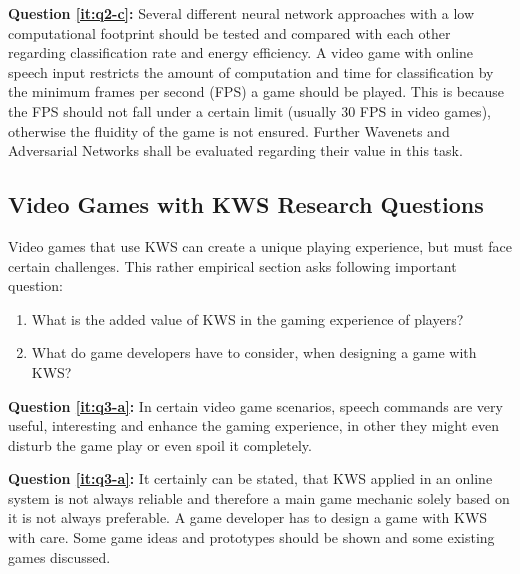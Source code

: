 \textbf{Question \ref{it:q2-c}:}
Several different neural network approaches with a low computational footprint should be tested and compared with each other regarding classification rate and energy efficiency. 
A video game with online speech input restricts the amount of computation and time for classification by the minimum frames per second (FPS) a game should be played.
This is because the FPS should not fall under a certain limit (usually 30 FPS in video games), otherwise the fluidity of the game is not ensured.
Further Wavenets and Adversarial Networks shall be evaluated regarding their value in this task.



\subsection{Video Games with KWS Research Questions}\label{sec:intro_rq_games}
Video games that use KWS can create a unique playing experience, but must face certain challenges.
This rather empirical section asks following important question:

\begin{enumerate}[label={Q.3.\alph*)}, leftmargin=1.75cm]
    \item What is the added value of KWS in the gaming experience of players?
    \label{it:q3-a}
    \item What do game developers have to consider, when designing a game with KWS?
    \label{it:q3-b}
    
\end{enumerate}
\noindent
\textbf{Question \ref{it:q3-a}:} %
In certain video game scenarios, speech commands are very useful, interesting and enhance the gaming experience, in other they might even disturb the game play or even spoil it completely.

\textbf{Question \ref{it:q3-a}:} It certainly can be stated, that KWS applied in an online system is not always reliable and therefore a main game mechanic solely based on it is not always preferable.
A game developer has to design a game with KWS with care.
Some game ideas and prototypes should be shown and some existing games discussed.

